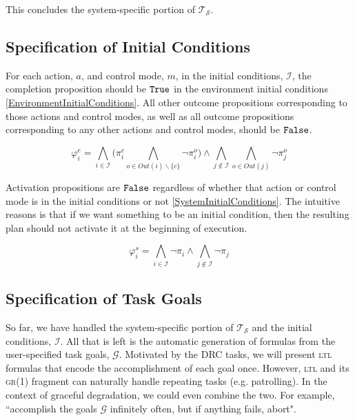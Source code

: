 This concludes the system-specific portion of $\mathcal{T_S}$.


\subsection{Specification of Initial Conditions}

For each action, $a$, and control mode, $m$, in the initial conditions, $\mathcal{I}$, the completion proposition should be $\mathtt{True}$ in the environment initial conditions \eqref{EnvironmentInitialConditions}.
All other outcome propositions corresponding to those actions and control modes, as well as all outcome propositions corresponding to any other actions and control modes, should be $\mathtt{False}$.

\begin{equation}\label{EnvironmentInitialConditions}
	\varphi_i^e = \bigwedge \limits_{i \in \mathcal{I}} \Big( \pi_i^c \bigwedge \limits_{o \in Out(i)\backslash \{c\}} \lnot \pi_i^o \Big) \wedge \bigwedge \limits_{j \not\in \mathcal{I}} \bigwedge \limits_{o \in Out(j)} \lnot \pi_j^o
\end{equation}

Activation propositions are $\mathtt{False}$ regardless of whether that action or control mode is in the initial conditions or not \eqref{SystemInitialConditions}.
The intuitive reasons is that if we want something to be an initial condition, then the resulting plan should not activate it at the beginning of execution.

\begin{equation}\label{SystemInitialConditions}
	\varphi_i^s = \bigwedge \limits_{i \in \mathcal{I}} \lnot \pi_i \wedge \bigwedge \limits_{j \not \in \mathcal{I}} \lnot \pi_j
\end{equation}



\subsection{Specification of Task Goals}\label{S:ltl-goals}

So far, we have handled the system-specific portion of $\mathcal{T_S}$ and the initial conditions, $\mathcal{I}$.
All that is left is the automatic generation of formulas from the user-specified task goals, $\mathcal{G}$.
Motivated by the DRC tasks, we will present \textsc{ltl} formulas that encode the accomplishment of each goal once.
However, \textsc{ltl} and its \textsc{gr(1)} fragment can naturally handle repeating tasks (e.g. patrolling).
In the context of graceful degradation, we could even combine the two.
For example, ``accomplish the goals $\mathcal{G}$ infinitely often, but if anything fails, abort".

